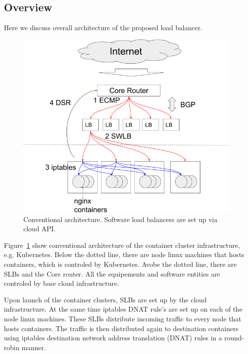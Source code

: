 \subsection{Overview}\label{Network}
Here we discuss overall architecture of the proposed load balancer.
\begin{figure}
\includegraphics[width=\columnwidth]{Figs/google_lb}
\caption{Conventional architecture. Software load balancers are set up via cloud API. }
\label{fig:google_lb}
\end{figure}
Figure~\ref{fig:google_lb} show conventional architecture of the container cluster infrastructure, e.g. Kubernetes.
Below the dotted line, there are node linux machines that hosts containers, which is controled by Kubernetes.
Avobe the dotted line, there are SLBs and the Core router.
All the equipements and software entities are controled by base cloud infrastructure.

Upon launch of the container clusters, SLBs are set up by the cloud infrastructure.
At the same time iptables DNAT rule's are set up on each of the node linux machines.
These SLBs distribute incoming traffic to every node that hosts containers.
The traffic is then distributed again to destination containers using iptables destination 
network address translation (DNAT)\cite{MartinA.Brown2017,Marmol2015} rules in a round-robin manner. 

